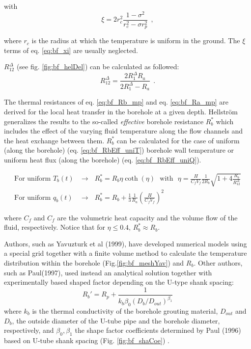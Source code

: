 \documentclass[a4paper,oneside,11pt]{report}
\begin{document}
with
\begin{equation} \label{eq:bf_xi}
	\xi = 2 r_c^2 \frac{1-\sigma^2}{r_c^2 - \sigma r_p^2}  \  \ ,
\end{equation}

where $r_c$ is the radius at which the temperature is uniform in the ground. The $\xi$ terms of eq. \ref{eq:bf_xi} are usually neglected.

$R_{12}^\Delta$ (see fig. \ref{fig:bf_helDel}) can be calculated as followed:
\begin{equation} \label{eq:bf_RDelta}
	R_{12}^\Delta = \frac{2 R_1^\Delta R_a}{2 R_1^\Delta - R_a} \ \ .
\end{equation}
	
The thermal resistances of eq. \ref{eq:bf_Rb_mp} and eq. \ref{eq:bf_Ra_mp} are derived for the local heat transfer in the borehole at a given depth. Hellstr\"om generalizes the results to the so-called \textit{effective} borehole resistance $R_b^*$ which includes the effect of the varying fluid temperature along the flow channels and the heat exchange between them. $R_b^*$ can be calculated for the case of uniform (along the borehole) (eq. \ref{eq:bf_RbEff_uniT}) borehole wall temperature or uniform heat flux (along the borehole) (eq. \ref{eq:bf_RbEff_uniQ}).

\begin{align}
	\text{For uniform $T_b(t)$} & \rightarrow \ \ \ R_b^* = R_b \eta \coth(\eta) \ \ \ \text{with} \ \ \ \eta = \frac{H}{C_f V_f}\frac{1}{2 R_b}\sqrt{1 + 4 \frac{R_b}{R_{12}^\Delta}} \label{eq:bf_RbEff_uniT} \\
	\text{For uniform $q_b(t)$} & \rightarrow \ \ \ R_b^* = R_b + \frac{1}{3}\frac{1}{R_a} \left(\frac{H}{C_f V_f} \right)^2  \label{eq:bf_RbEff_uniQ}
\end{align}

where $C_f$ and $C_f$ are the volumetric heat capacity and the volume flow of the fluid, respectively. Notice that for $\eta \leq 0.4$, $R_b^* \approx R_b$.

Authors, such as Yavuzturk et al (1999), have developed numerical models using a special grid together with a finite volume method to calculate the temperature distribution within the borehole (Fig.\ref{fig:bf_meshYav}) and $R_b$. Other authors, such as Paul(1997), used instead an analytical solution together with experimentally based shaped factor depending on the U-type shank spacing:
\begin{equation} \label{eq:bf_RbYav}
	R_b' = R_p + \frac{1}{k_b \beta_0 (D_b / D_{out} )^{\beta_1} }
\end{equation}
where $k_b$ is the thermal conductivity of the borehole grouting material, $D_{out}$ and $D_b$, the outside diameter of the U-tube pipe and the borehole diameter, respectively, and $\beta_0, \beta_1$ the shape factor coefficients determined by Paul (1996) based on U-tube shank spacing (Fig. \ref{fig:bf_shaCoe}) \cite{chi07}. 
\end{document}
